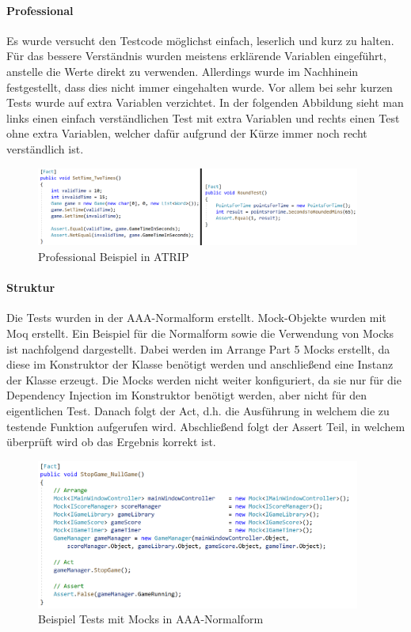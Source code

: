 \paragraph{Professional}
Es wurde versucht den Testcode möglichst einfach, leserlich und kurz zu halten. Für das bessere Verständnis wurden meistens erklärende Variablen eingeführt, anstelle die Werte direkt zu verwenden. Allerdings wurde im Nachhinein festgestellt, dass dies nicht immer eingehalten wurde. Vor allem bei sehr kurzen Tests wurde auf extra Variablen verzichtet. In der folgenden Abbildung sieht man links einen einfach verständlichen Test mit extra Variablen und rechts einen Test ohne extra Variablen, welcher dafür aufgrund der Kürze immer noch recht verständlich ist.

\begin{figure}[!htb]
\centering
\includegraphics[width=0.95\textwidth]{Bilder/professional_example.PNG}
\caption{\label{Abb:professional_example} Professional Beispiel in ATRIP}
\end{figure}


\paragraph{Struktur}
Die Tests wurden in der AAA-Normalform erstellt. Mock-Objekte wurden mit Moq erstellt. Ein Beispiel für die Normalform sowie die Verwendung von Mocks ist nachfolgend dargestellt. Dabei werden im \glqq Arrange\grqq{} Part 5 Mocks erstellt, da diese im Konstruktor der Klasse benötigt werden und anschließend eine Instanz der Klasse erzeugt. Die Mocks werden nicht weiter konfiguriert, da sie nur für die Dependency Injection im Konstruktor benötigt werden, aber nicht für den eigentlichen Test. Danach folgt der \glqq Act\grqq{}, d.h. die Ausführung in welchem die zu testende Funktion aufgerufen wird. Abschließend folgt der \glqq Assert\grqq{} Teil, in welchem überprüft wird ob das Ergebnis korrekt ist.


\begin{figure}[!htb]
\centering
\includegraphics[width=0.95\textwidth]{Bilder/UnitTest.PNG}
\caption{\label{Abb:UnitTest}Beispiel Tests mit Mocks in AAA-Normalform}
\end{figure}

